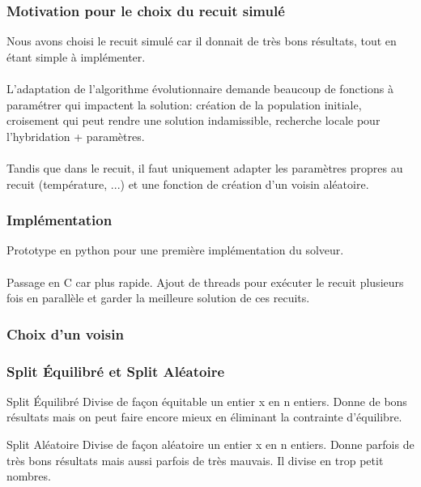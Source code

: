 \documentclass{beamer}
\begin{document}
\begin{frame}
    \frametitle{Motivation pour le choix du recuit simulé}
    Nous avons choisi le recuit simulé car il donnait de très bons résultats, tout en étant simple à implémenter.\\~\\

    L'adaptation de l'algorithme évolutionnaire demande beaucoup de fonctions à paramétrer qui impactent la solution: création de la population initiale, croisement qui peut rendre une solution indamissible, recherche locale pour l'hybridation + paramètres.\\~\\

    Tandis que dans le recuit, il faut uniquement adapter les paramètres propres au recuit (température, ...) et une fonction de création d'un voisin aléatoire.
\end{frame}

\begin{frame}
    \frametitle{Implémentation}
    Prototype en python pour une première implémentation du solveur.\\~\\

    Passage en C car plus rapide. Ajout de threads pour exécuter le recuit plusieurs fois en parallèle et garder la meilleure solution de ces recuits.

\end{frame}

\begin{frame}
    \frametitle{Choix d'un voisin}
    
\end{frame}

\begin{frame}
    \frametitle{Split Équilibré et Split Aléatoire}
    \begin{block}{Split Équilibré}
    Divise de façon équitable un entier x en n entiers.
    \MVRightarrow{} Donne de bons résultats mais on peut faire encore mieux en éliminant la contrainte d'équilibre.
    \end{block}

    \begin{block}{Split Aléatoire}
    Divise de façon aléatoire un entier x en n entiers.
    \MVRightarrow{} Donne parfois de très bons résultats mais aussi parfois de très mauvais. Il divise en trop petit nombres.
    \end{block}
\end{frame}
\end{document}
